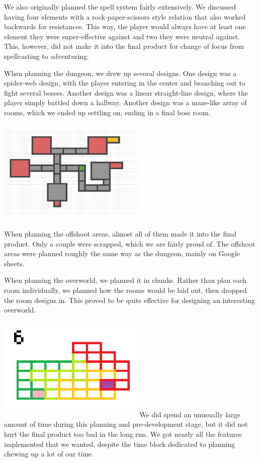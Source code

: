\documentclass{sigchi}
\begin{document}
We also originally planned the spell system fairly extensively.  We discussed having four elements with a rock-paper-scissors style relation that also worked backwards for resistances.  This way, the player would always have at least one element they were super-effective against and two they were neutral against.  This, however, did not make it into the final product for change of focus from spellcasting to adventuring.

When planning the dungeon, we drew up several designs.  One design was a spider-web design, with the player entering in the center and branching out to fight several bosses.  Another design was a linear straight-line design, where the player simply battled down a hallway.  Another design was a maze-like array of rooms, which we ended up settling on, ending in a final boss room.

\includegraphics*[width=7cm, height=5cm]{./figures/DungeonLayout.png}

When planning the offshoot areas, almost all of them made it into the final product.  Only a couple were scrapped, which we are fairly proud of.  The offshoot areas were planned roughly the same way as the dungeon, mainly on Google sheets.

When planning the overworld, we planned it in chunks.  Rather than plan each room individually, we planned how the rooms would be laid out, then dropped the room designs in.  This proved to be quite effective for designing an interesting overworld.

\includegraphics*[width=7cm, height=5cm]{./figures/overworld.png}
We did spend an unusually large amount of time during this planning and pre-development stage, but it did not hurt the final product too bad in the long run.  We got nearly all the features implemented that we wanted, despite the time block dedicated to planning chewing up a lot of our time.
\end{document}
